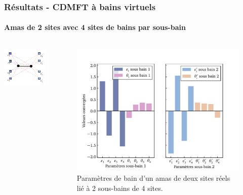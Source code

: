 \begin{frame}
    \frametitle{Résultats - CDMFT à bains virtuels}
    \framesubtitle{Amas de 2 sites avec 4 sites de bains par sous-bain}
    \begin{columns}
        \centering
        \includegraphics[scale=0.9]{figures/results/clusters/1D_2s_4vb_cluster.pdf}
        \begin{figure}
            \includegraphics[scale=0.45]{figures/results/graphs/1D_2s_4vb.pdf}
            \caption{Paramètres de bain d'un amas de deux sites réels lié à 2 sous-bains de 4 sites.}
            \label{fig: simu_2s_4vb}
        \end{figure}
    \end{columns}
\end{frame}
